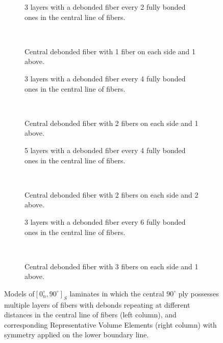 \documentclass[review]{elsarticle}
\begin{document}
\begin{figure}[!h]
\centering
    \begin{subfigure}[b]{0.45\textwidth}
        \caption{3 layers with a debonded fiber every 2 fully bonded ones in the central line of fibers.}\label{subfig:3layersevery2}
    \end{subfigure} ~
    \begin{subfigure}[b]{0.45\textwidth}
        \caption{Central debonded fiber with 1 fiber on each side and 1 above.}\label{subfig:1eachside1above}
    \end{subfigure}

    \begin{subfigure}[b]{0.45\textwidth}
        \caption{3 layers with a debonded fiber every 4 fully bonded ones in the central line of fibers.}\label{subfig:3layersevery4}
    \end{subfigure} ~
    \begin{subfigure}[b]{0.45\textwidth}
        \caption{Central debonded fiber with 2 fibers on each side and 1 above.}\label{subfig:2eachside1above}
    \end{subfigure}

    \begin{subfigure}[b]{0.45\textwidth}
        \caption{5 layers with a debonded fiber every 4 fully bonded ones in the central line of fibers.}\label{subfig:5layersevery4}
    \end{subfigure} ~
    \begin{subfigure}[b]{0.45\textwidth}
        \caption{Central debonded fiber with 2 fibers on each side and 2 above.}\label{subfig:2eachside2above}
    \end{subfigure}

    \begin{subfigure}[b]{0.45\textwidth}
        \caption{3 layers with a debonded fiber every 6 fully bonded ones in the central line of fibers.}\label{subfig:3layersevery6}
    \end{subfigure} ~
    \begin{subfigure}[b]{0.45\textwidth}
        \caption{Central debonded fiber with 3 fibers on each side and 1 above.}\label{subfig:3eachside1above}
    \end{subfigure}
\caption{Models of$\left[0^{\circ}_{n}, 90^{\circ}\right]_{S}$ laminates in which the central $90^{\circ}$ ply possesses multiple layers of fibers with debonds repeating at different distances in the central line of fibers (left column), and corresponding Representative Volume Elements (right column) with symmetry applied on the lower boundary line.}\label{fig:fibersOnSideAndTopModels}
\end{figure}
\end{document}
